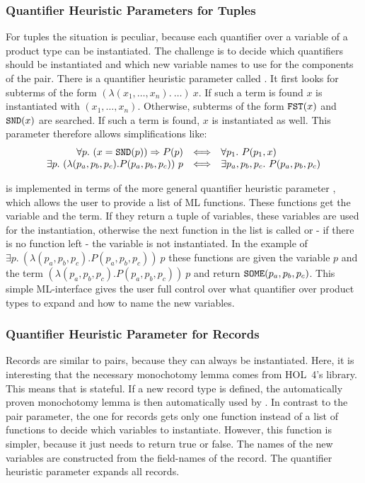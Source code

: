 \subsubsection{Quantifier Heuristic Parameters for Tuples}

For tuples the situation is peculiar, because each quantifier over a variable of a product type
can be instantiated. The challenge is to decide which quantifiers should be instantiated and 
which new variable names to use for the components of the pair.
There is a quantifier heuristic parameter called . It first looks for
subterms of the form $(\lambda (x_1, \ldots, x_n).\ \ldots)\ x$. If such a term is found $x$ is instantiated with
$(x_1, \ldots, x_n)$. Otherwise, subterms of the form $\holtxt{FST}(x)$ and $\holtxt{SND}(x)$ are searched. If such a term
is found, $x$ is instantiated as well. This parameter therefore allows simplifications like:
%
\[\begin{array}{r@{\quad \Longleftrightarrow \quad}l}
\forall p.\ (x = \holtxt{SND}(p)) \Rightarrow P(p)& \forall p_1.\ P(p_1, x) \\
\exists p.\ (\lambda (p_a, p_b, p_c). P(p_a, p_b, p_c))\ p & \exists p_a, p_b, p_c.\ P(p_a, p_b, p_c) 
\end{array}\]

 is implemented in terms of the more general
quantifier heuristic parameter , which allows the
user to provide a list of ML functions. These functions get the
variable and the term. If they return a tuple of variables, these
variables are used for the instantiation, otherwise the next function
in the list is called or - if there is no function left - the variable
is not instantiated. In the example of $\exists p.\ (\lambda (p_a,
p_b, p_c). P(p_a, p_b, p_c))\ p$ these functions are given the
variable $p$ and the term $(\lambda (p_a, p_b, p_c). P(p_a, p_b,
p_c))\ p$ and return $\holtxt{SOME} (p_a, p_b, p_c)$.  This simple
ML-interface gives the user full control over what quantifier over
product types to expand and how to name the new variables.

\subsubsection{Quantifier Heuristic Parameter for Records}

Records are similar to pairs, because they can always be instantiated. Here, it is interesting that the necessary
monochotomy lemma comes from HOL~4's  library. This means that  is stateful.
If a new record type is defined, the automatically proven monochotomy lemma is then automatically used
by . In contrast to the pair parameter, the one for records gets only one function instead of a
list of functions to decide which variables to instantiate. However, this function is simpler, because it just needs
to return true or false. The names of the new variables are constructed from the field-names of the record.
The quantifier heuristic parameter  expands all records.

